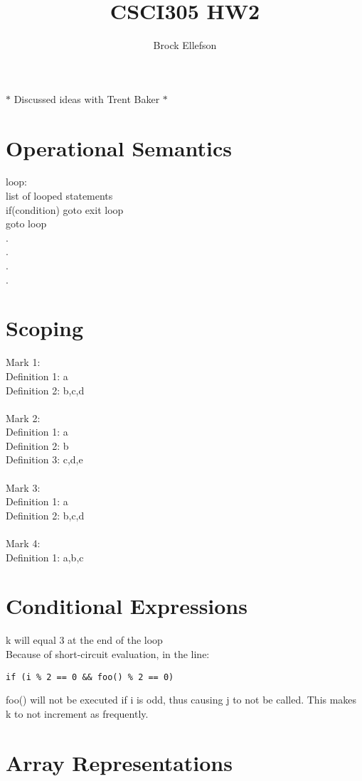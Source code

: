 \documentclass[10pt,letterpaper]{article}
\author{Brock Ellefson}
\title{CSCI305 HW2}
\begin{document}
\maketitle
$\ast$ Discussed ideas with Trent Baker $\ast$
\section{Operational Semantics}
loop:\\
	list of looped statements\\
	if(condition) goto exit loop\\
	goto loop\\
.\\.\\.\\.

\section{Scoping}
Mark 1:\\
Definition 1: a\\
Definition 2: b,c,d\\\\
Mark 2:\\
Definition 1: a\\
Definition 2: b\\
Definition 3: c,d,e\\\\
Mark 3:\\
Definition 1: a\\
Definition 2: b,c,d\\\\
Mark 4:\\
Definition 1: a,b,c
\section{Conditional Expressions}
k will equal 3 at the end of the loop\\
Because of short-circuit evaluation, in the line:
\begin{verbatim}
if (i % 2 == 0 && foo() % 2 == 0)
\end{verbatim}
foo() will not be executed if i is odd, thus causing j to not be called. This makes k to not increment as frequently. 

\section{Array Representations}
\end{document}
